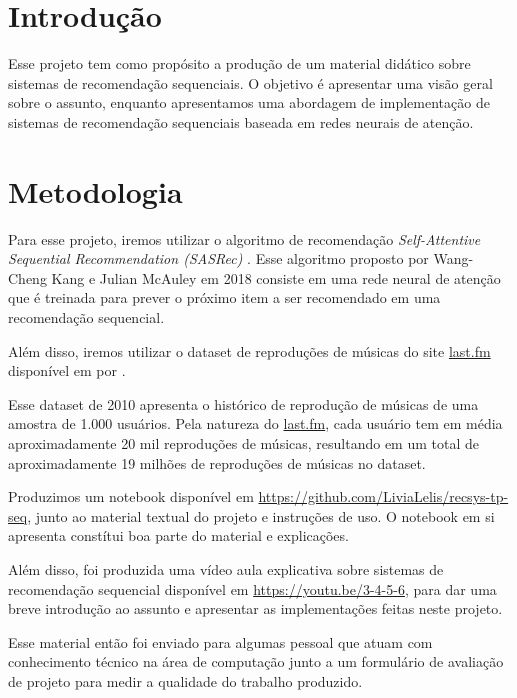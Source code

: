 \nocite{srssbrs} %

\section*{Introdução}

Esse projeto tem como propósito a produção de um material didático
sobre sistemas de recomendação sequenciais.
O objetivo é apresentar uma visão geral sobre o assunto, enquanto
apresentamos uma abordagem de implementação de sistemas de recomendação
sequenciais baseada em  redes neurais de atenção.

\section*{Metodologia}

Para esse projeto, iremos utilizar o algoritmo de recomendação
\textit{Self-Attentive Sequential Recommendation (SASRec)} \cite{sasrec}.
Esse algoritmo proposto por Wang-Cheng Kang e Julian McAuley em 2018
consiste em uma rede neural de atenção que é treinada para prever o
próximo item a ser recomendado em uma recomendação sequencial.

Além disso, iremos utilizar o dataset de reproduções de músicas
do site \url{last.fm} disponível em 
\cite{lastfm_dataset} por \citeauthor{lastfm_book} \cite{lastfm_book}.

Esse dataset de 2010 apresenta o histórico de reprodução de músicas
de uma amostra de 1.000 usuários. Pela natureza do \url{last.fm},
cada usuário tem em média aproximadamente 20 mil reproduções de músicas,
resultando em um total de aproximadamente 19 milhões de reproduções
de músicas no dataset.

Produzimos um notebook disponível em \url{https://github.com/LiviaLelis/recsys-tp-seq},
junto ao material textual do projeto e instruções de uso. O notebook em
si apresenta constítui boa parte do material e explicações.

Além disso, foi produzida uma vídeo aula explicativa sobre sistemas de
recomendação sequencial disponível em \url{https://youtu.be/3-4-5-6},
para dar uma breve introdução ao assunto e apresentar as implementações
feitas neste projeto.

Esse material então foi enviado para algumas pessoal que atuam com 
conhecimento técnico na área de computação junto a um formulário de
avaliação de projeto para medir a qualidade do trabalho produzido.

